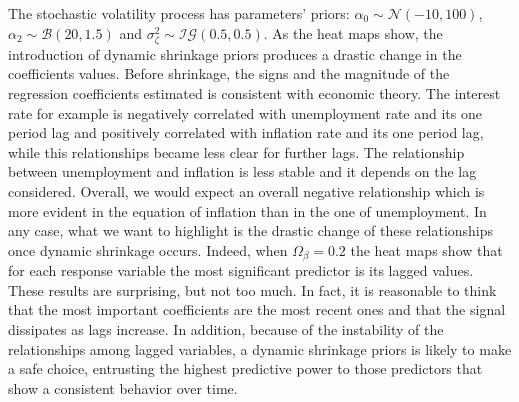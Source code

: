 \documentclass[
  12pt,
]{book}
\theoremstyle{break}
\theoremstyle{nonumberplain}
\begin{document}
The stochastic volatility process has parameters' priors:
\(\alpha_0\sim\mathcal{N}(-10,100)\),
\(\alpha_2\sim\mathcal{B}(20,1.5)\) and
\(\sigma^2_{\zeta}\sim\mathcal{IG}(0.5,0.5)\). As the heat maps show,
the introduction of dynamic shrinkage priors produces a drastic change
in the coefficients values. Before shrinkage, the signs and the
magnitude of the regression coefficients estimated is consistent with
economic theory. The interest rate for example is negatively correlated
with unemployment rate and its one period lag and positively correlated
with inflation rate and its one period lag, while this relationships
became less clear for further lags. The relationship between
unemployment and inflation is less stable and it depends on the lag
considered. Overall, we would expect an overall negative relationship
which is more evident in the equation of inflation than in the one of
unemployment. In any case, what we want to highlight is the drastic
change of these relationships once dynamic shrinkage occurs. Indeed,
when \(\Omega_\beta=0.2\) the heat maps show that for each response
variable the most significant predictor is its lagged values. These
results are surprising, but not too much. In fact, it is reasonable to
think that the most important coefficients are the most recent ones and
that the signal dissipates as lags increase. In addition, because of the
instability of the relationships among lagged variables, a dynamic
shrinkage priors is likely to make a safe choice, entrusting the highest
predictive power to those predictors that show a consistent behavior
over time.
\end{document}
